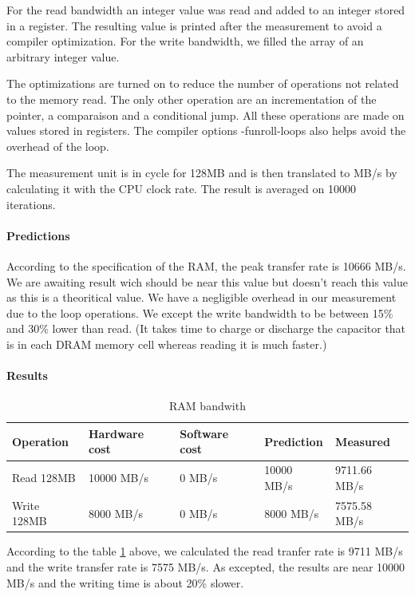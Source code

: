 For the read bandwidth an integer value was read and added to an integer stored in a register.
The resulting value is printed after the measurement to avoid a compiler optimization.
For the write bandwidth, we filled the array of an arbitrary integer value.

The optimizations are turned on to reduce the number of operations not related to the memory read.
The only other operation are an incrementation of the pointer, a comparaison and a conditional jump.
All these operations are made on values stored in registers.
The compiler options -funroll-loops also helps avoid the overhead of the loop.

The measurement unit is in cycle for 128MB and is then translated to MB/s by calculating it with the CPU clock rate.
The result is averaged on 10000 iterations.

\paragraph{Predictions}
According to the specification of the RAM, the peak transfer rate is 10666 MB/s.
We are awaiting result wich should be near this value but doesn't reach this value as this is a theoritical value.
We have a negligible overhead in our measurement due to the loop operations.
We except the write bandwidth to be between 15\% and 30\% lower than read.
(It takes time  to charge or discharge the capacitor that is in each DRAM memory cell whereas
reading it is much faster.)

\paragraph{Results}
\begin{table}[h]
\begin{center}
\begin{tabular}{| l | l | l | l | l |}
\hline
Operation 	& Hardware cost & Software cost & Prediction 	& Measured \\
\hline
Read 128MB 	& 10000 MB/s	& 0 MB/s	& 10000 MB/s	& 9711.66 MB/s \\
\hline
Write 128MB 	& 8000 MB/s	& 0 MB/s	& 8000 MB/s	& 7575.58 MB/s \\
\hline
\end{tabular}
\end{center}
\caption{RAM bandwith\label{tab:ram-bandwidth}}
\end{table}

According to the table \ref{tab:ram-bandwidth} above,
we calculated the read tranfer rate is 9711 MB/s and the write transfer rate is 7575 MB/s.
As excepted, the results are near 10000 MB/s and the writing time is about 20\%
slower.

